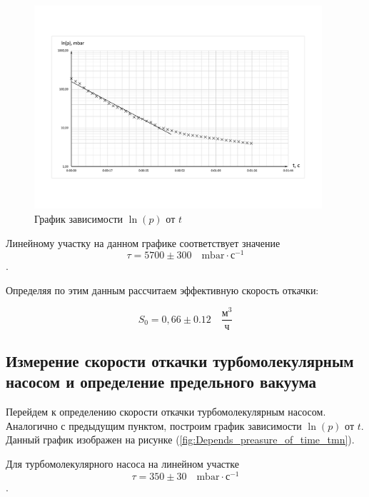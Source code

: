 \documentclass[12pt,a4paper]{article}
\begin{document}
	
	\begin{figure}[h!]
		\begin{center}
			\includegraphics[width = 0.95\textwidth]{Depends_preasure_of_time}
			\caption{График зависимости $\ln (p) $ от $t$}
			\label{fig:Depends_preasure_of_time}
		\end{center}
	\end{figure}
	
	Линейному участку на данном графике соответствует значение $$\tau = 5 700 \pm 300\quad \text{mbar}\cdot\text{с}^{-1}$$.
	
	Определяя по этим данным рассчитаем эффективную скорость откачки:
	
	$$S_{0} = 0,66 \pm 0.12 \quad \frac{\text{м}^{3}}{\text{ч}}$$
	
	
	
	\subsection{Измерение скорости откачки турбомолекулярным насосом и определение предельного вакуума}
	
	Перейдем к определению скорости откачки турбомолекулярным насосом. Аналогично с предыдущим пунктом, построим график зависимости $\ln (p) $ от $t$. Данный график изображен на рисунке (\ref{fig:Depends_preasure_of_time_tmn}).
	
	Для турбомолекулярного насоса на линейном участке $$\tau = 350 \pm 30\quad \text{mbar}\cdot\text{с}^{-1}$$.
	
\end{document}

